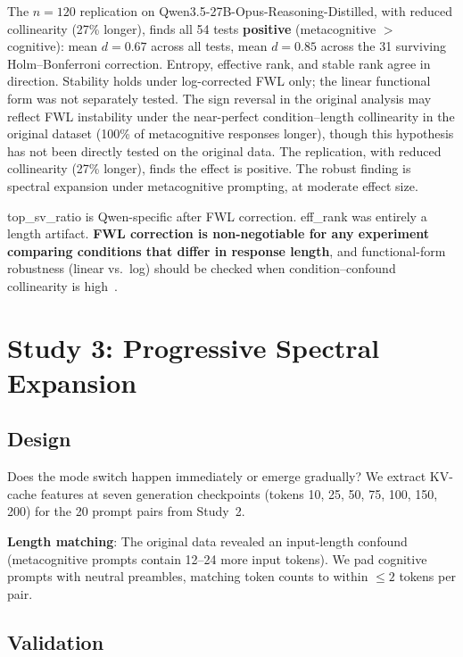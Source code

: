 \documentclass[11pt,a4paper]{article}
\begin{document}
The $n{=}120$ replication on Qwen3.5-27B-Opus-Reasoning-Distilled, with
reduced collinearity (27\% longer), finds all 54 tests \textbf{positive}
(metacognitive $>$ cognitive): mean $d = 0.67$ across all tests, mean
$d = 0.85$ across the 31 surviving Holm--Bonferroni correction. Entropy,
effective rank, and stable rank agree in direction. Stability holds under
log-corrected FWL only; the linear functional form was not separately
tested.
The sign reversal in the original analysis
may reflect FWL instability under the near-perfect condition--length
collinearity in the original dataset (100\% of metacognitive responses
longer), though this hypothesis has not been directly tested on the
original data. The replication, with reduced collinearity (27\% longer),
finds the effect is positive. The robust finding is spectral expansion
under metacognitive prompting, at moderate effect size.

top\_sv\_ratio is Qwen-specific after FWL correction. eff\_rank was
entirely a length artifact. \textbf{FWL correction is non-negotiable
for any experiment comparing conditions that differ in response length},
and functional-form robustness (linear vs.\ log) should be checked when
condition--confound collinearity is high~\citep{king2006dangers}.

\section{Study 3: Progressive Spectral Expansion}
\label{sec:study3}

\subsection{Design}

Does the mode switch happen immediately or emerge gradually? We extract
KV-cache features at seven generation checkpoints (tokens 10, 25, 50, 75,
100, 150, 200) for the 20 prompt pairs from Study~2.

\textbf{Length matching}: The original data revealed an input-length
confound (metacognitive prompts contain 12--24 more input tokens). We pad
cognitive prompts with neutral preambles, matching token counts to within
$\leq 2$ tokens per pair.

\subsection{Validation}
\end{document}
